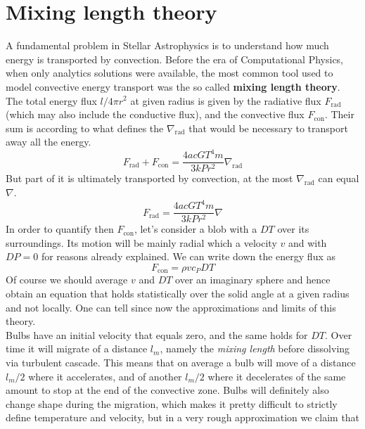 \section{Mixing length theory}
A fundamental problem in Stellar Astrophysics is to understand how much energy is transported by convection. Before the era of Computational Physics, when only analytics solutions were available, the most common tool used to model convective energy transport was the so called \textbf{mixing length theory}. \\
The total energy flux $l/4 \pi r^2$ at given radius is given by the radiative flux $F_{\mathrm{rad}}$ (which may also include the conductive flux), and the convective flux $F_{\mathrm{con}}$. Their sum is according to \label{nablarad} what defines the $\nabla_{\mathrm{rad}}$ that would be necessary to transport away all the energy.
\begin{equation}\label{7.1}
F_{\mathrm{rad}}+ F_{\mathrm{con}}= \frac{4 a c G T^4 m }{3 k P r^2} \nabla_{\mathrm{rad}}
\end{equation}
But part of it is ultimately transported by convection, at the most $\nabla_{\mathrm{rad}}$ can equal $\nabla$. 
\begin{equation}\label{7.2}
F_{\mathrm{rad}}= \frac{4 a c G T^4 m}{3 k P r^2} \nabla
\end{equation}
In order to quantify then $F_{\mathrm{con}}$, let's consider a blob with a $DT$ over its surroundings. Its motion will be mainly radial which a velocity $v$ and with $DP=0$ for reasons already explained. We can write down the energy flux as
\begin{equation}\label{fconv}
	F_{\mathrm{con}}=\rho  v  c_P  DT
\end{equation}
Of course we should average $v$ and $DT$ over an imaginary sphere and hence obtain an equation that holds statistically over the solid angle at a given radius and not locally. One can tell since now the approximations and limits of this theory. \\
Bulbs have an initial velocity that equals zero, and the same holds for $DT$. Over time it will migrate of a distance $l_m$, namely the \textit{mixing length} before dissolving via turbulent cascade. This means that on average a bulb will move of a distance $l_m/2$ where it accelerates, and of another $l_m/2$ where it decelerates of the same amount to stop at the end of the convective zone. Bulbs will definitely also change shape during the migration, which makes it pretty difficult to strictly define temperature and velocity, but in a very rough approximation we claim that
